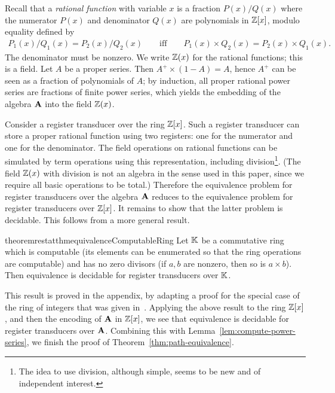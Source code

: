 Recall that a \emph{rational function} with variable $x$ is a fraction $P(x)/Q(x)$ 
where  the numerator $P(x)$ and denominator $Q(x)$ are polynomials in $\mathbb Z[x]$, modulo equality defined by 
\begin{align*}
P_1(x)/Q_1(x) = P_2(x)/Q_2(x) \qquad \text{iff} \qquad P_1(x) \times Q_2(x) = P_2(x) \times Q_1(x).
\end{align*}
The denominator must be nonzero. 
We write $\mathbb Z(x)$ for the rational functions; this is a field. Let $A$ be a proper series. Then $A^+ \times (1-A) = A$, hence $A^+$ can be seen as a fraction of polynomials of $A$; by induction, all proper rational power series  are fractions of finite power series, which yields the embedding of the algebra $\mathbf{A}$ into the field $\mathbb Z(x)$.  

Consider a register transducer over the ring $\mathbb Z[x]$. Such a register transducer can store a proper rational function using two registers: one for the numerator and one for the denominator. The field operations on rational functions can be simulated by term operations using this representation, including  division\footnote{The idea to use  division, although simple, seems to be new and of independent interest.}. (The field  $\mathbb Z(x)$ with division is not  an algebra in the sense used in this paper, since we require all basic operations  to be total.) Therefore the equivalence problem for register transducers over the algebra $\mathbf{A}$ reduces to the equivalence problem for register transducers over $\mathbb Z[x]$. It remains to show that the latter problem is decidable. This follows from a more general result.

\begin{restatable}{theoremrestat}{thmequivalenceComputableRing}\label{thm:equivalence-for-computable-ring}
    Let ${\mathbb K}$ be a commutative ring which is computable (its elements can be enumerated so that the ring operations are computable) and has no zero divisors (if $a,b$ are nonzero, then so is $a \times b$). Then equivalence is decidable for register transducers over ${\mathbb K}$.
\end{restatable}
This result is proved in the appendix, by adapting a proof for the special case of the ring of integers that was given in~\cite[Theorem 6.6]{seidlManethKemper2018}. 
Applying the above result to the ring $\mathbb Z[x]$, and then the encoding of $\mathbf{A}$ in $\mathbb Z[x]$, we see that equivalence is decidable for register transducers over $\mathbf{A}$. Combining this with Lemma~\ref{lem:compute-power-series}, we finish the proof of Theorem~\ref{thm:path-equivalence}.


